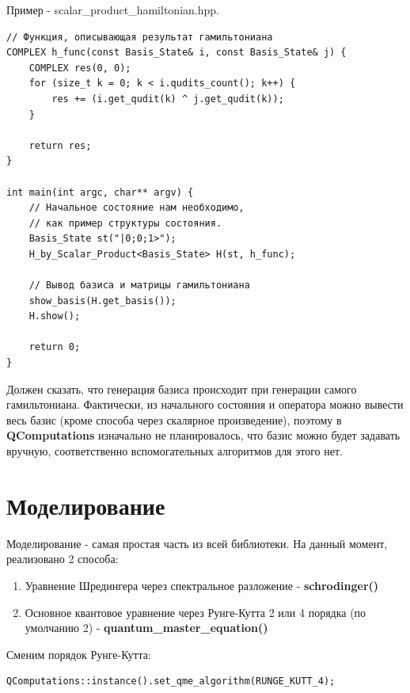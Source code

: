 \documentclass[12pt,fleqn]{article}
\begin{document}
        Пример - \textsf{scalar\_product\_hamiltonian.hpp}.

\begin{mdframed}[linecolor=black, topline=true, bottomline=true,
leftline=false, rightline=false]
\begin{verbatim}
// Функция, описывающая результат гамильтониана
COMPLEX h_func(const Basis_State& i, const Basis_State& j) {
    COMPLEX res(0, 0);
    for (size_t k = 0; k < i.qudits_count(); k++) {
        res += (i.get_qudit(k) ^ j.get_qudit(k));
    }

    return res;
}

int main(int argc, char** argv) {
    // Начальное состояние нам необходимо, 
    // как пример структуры состояния.
    Basis_State st("|0;0;1>");
    H_by_Scalar_Product<Basis_State> H(st, h_func);

    // Вывод базиса и матрицы гамильтониана
    show_basis(H.get_basis());
    H.show();

    return 0;
}
\end{verbatim}
\end{mdframed}

        Должен сказать, что генерация базиса происходит при генерации самого гамильтониана. Фактически, из начального состояния и
        оператора можно вывести весь базис (кроме способа через скалярное произведение), поэтому в \textbf{QComputations} изначально 
        не планировалось, что базис можно будет задавать вручную, соответственно вспомогательных алгоритмов для этого нет.

        \section{Моделирование}

        Моделирование - самая простая часть из всей библиотеки. На данный момент, реализовано 2 способа:
        \begin{enumerate}
            \item{Уравнение Шредингера через спектральное разложение - \textbf{schrodinger()}}
            \item{Основное квантовое уравнение через Рунге-Кутта 2 или 4 порядка (по умолчанию 2) - \textbf{quantum\_master\_equation()}}
        \end{enumerate}

        Сменим порядок Рунге-Кутта:
\begin{mdframed}[linecolor=black, topline=true, bottomline=true,
leftline=false, rightline=false]
\begin{verbatim}
QComputations::instance().set_qme_algorithm(RUNGE_KUTT_4);
\end{verbatim}
\end{mdframed}
\end{document}
